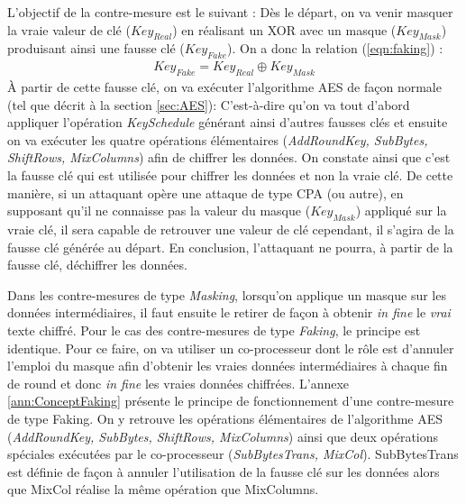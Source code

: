 \documentclass[oneside]{book}
\begin{document}
\hspace{-0.5 cm}L'objectif de la contre-mesure est le suivant : Dès le départ, on va venir masquer la vraie valeur de clé ($Key_{Real}$) en réalisant un XOR avec un masque ($Key_{Mask}$) produisant ainsi une fausse clé ($Key_{Fake}$). On a donc la relation (\ref{eqn:faking}) : 
\begin{gather}
	Key_{Fake} = Key_{Real} \oplus Key_{Mask}\label{eqn:faking}
\end{gather}
À partir de cette fausse clé, on va exécuter l'algorithme AES de façon normale (tel que décrit à la section \ref{sec:AES}): C'est-à-dire qu'on va tout d'abord appliquer l'opération \textit{KeySchedule} générant ainsi d'autres fausses clés et ensuite on va exécuter les quatre opérations élémentaires (\textit{AddRoundKey, SubBytes, ShiftRows, MixColumns}) afin de chiffrer les données. On constate ainsi que c'est la fausse clé qui est utilisée pour chiffrer les données et non la vraie clé. De cette manière, si un attaquant opère une attaque de type CPA (ou autre), en supposant qu'il ne connaisse pas la valeur du masque ($Key_{Mask}$) appliqué sur la vraie clé, il sera capable de retrouver une valeur de clé cependant, il s'agira de la fausse clé générée au départ. En conclusion, l'attaquant ne pourra, à partir de la fausse clé, déchiffrer les données.

Dans les contre-mesures de type \textit{Masking}, lorsqu'on applique un masque sur les données intermédiaires, il faut ensuite le retirer de façon à obtenir \textit{in fine} le \textit{vrai} texte chiffré. Pour le cas des contre-mesures de type \textit{Faking}, le principe est identique. Pour ce faire, on va utiliser un co-processeur dont le rôle est d'annuler l'emploi du masque afin d'obtenir les vraies données intermédiaires à chaque fin de round et donc \textit{in fine} les vraies données chiffrées. L'annexe \ref{ann:ConceptFaking} présente le principe de fonctionnement d'une contre-mesure de type Faking. On y retrouve les opérations élémentaires de l'algorithme AES (\textit{AddRoundKey, SubBytes, ShiftRows, MixColumns}) ainsi que deux opérations spéciales exécutées par le co-processeur (\textit{SubBytesTrans, MixCol}). SubBytesTrans est définie de façon à annuler l'utilisation de la fausse clé sur les données alors que MixCol réalise la même opération que MixColumns. 
\end{document}
